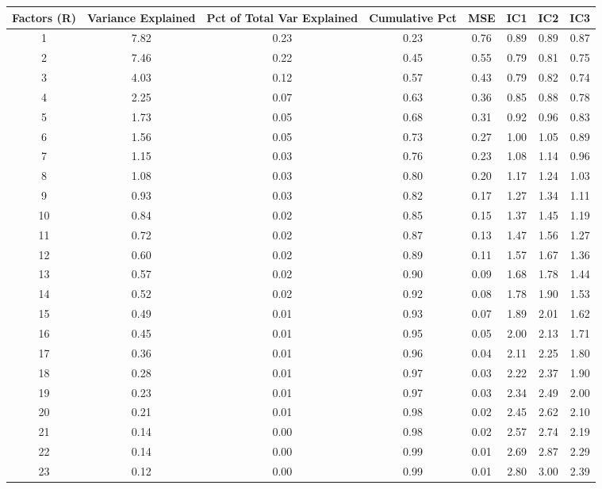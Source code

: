 \documentclass[11pt, letterpaper]{article}\usepackage[]{graphicx}\usepackage[]{color}
\begin{document}
\begin{table}[H]
\centering
\begingroup\scriptsize
\begin{tabular}{cccccccc}
  \hline
Factors (R) & Variance Explained & Pct of Total Var Explained & Cumulative Pct & MSE & IC1 & IC2 & IC3 \\ 
  \hline
  1 & 7.82 & 0.23 & 0.23 & 0.76 & 0.89 & 0.89 & 0.87 \\ 
    2 & 7.46 & 0.22 & 0.45 & 0.55 & 0.79 & 0.81 & 0.75 \\ 
    3 & 4.03 & 0.12 & 0.57 & 0.43 & 0.79 & 0.82 & 0.74 \\ 
    4 & 2.25 & 0.07 & 0.63 & 0.36 & 0.85 & 0.88 & 0.78 \\ 
    5 & 1.73 & 0.05 & 0.68 & 0.31 & 0.92 & 0.96 & 0.83 \\ 
    6 & 1.56 & 0.05 & 0.73 & 0.27 & 1.00 & 1.05 & 0.89 \\ 
    7 & 1.15 & 0.03 & 0.76 & 0.23 & 1.08 & 1.14 & 0.96 \\ 
    8 & 1.08 & 0.03 & 0.80 & 0.20 & 1.17 & 1.24 & 1.03 \\ 
    9 & 0.93 & 0.03 & 0.82 & 0.17 & 1.27 & 1.34 & 1.11 \\ 
   10 & 0.84 & 0.02 & 0.85 & 0.15 & 1.37 & 1.45 & 1.19 \\ 
   11 & 0.72 & 0.02 & 0.87 & 0.13 & 1.47 & 1.56 & 1.27 \\ 
   12 & 0.60 & 0.02 & 0.89 & 0.11 & 1.57 & 1.67 & 1.36 \\ 
   13 & 0.57 & 0.02 & 0.90 & 0.09 & 1.68 & 1.78 & 1.44 \\ 
   14 & 0.52 & 0.02 & 0.92 & 0.08 & 1.78 & 1.90 & 1.53 \\ 
   15 & 0.49 & 0.01 & 0.93 & 0.07 & 1.89 & 2.01 & 1.62 \\ 
   16 & 0.45 & 0.01 & 0.95 & 0.05 & 2.00 & 2.13 & 1.71 \\ 
   17 & 0.36 & 0.01 & 0.96 & 0.04 & 2.11 & 2.25 & 1.80 \\ 
   18 & 0.28 & 0.01 & 0.97 & 0.03 & 2.22 & 2.37 & 1.90 \\ 
   19 & 0.23 & 0.01 & 0.97 & 0.03 & 2.34 & 2.49 & 2.00 \\ 
   20 & 0.21 & 0.01 & 0.98 & 0.02 & 2.45 & 2.62 & 2.10 \\ 
   21 & 0.14 & 0.00 & 0.98 & 0.02 & 2.57 & 2.74 & 2.19 \\ 
   22 & 0.14 & 0.00 & 0.99 & 0.01 & 2.69 & 2.87 & 2.29 \\ 
   23 & 0.12 & 0.00 & 0.99 & 0.01 & 2.80 & 3.00 & 2.39 \\ 

\end{tabular}
\end{table}
\end{document}

